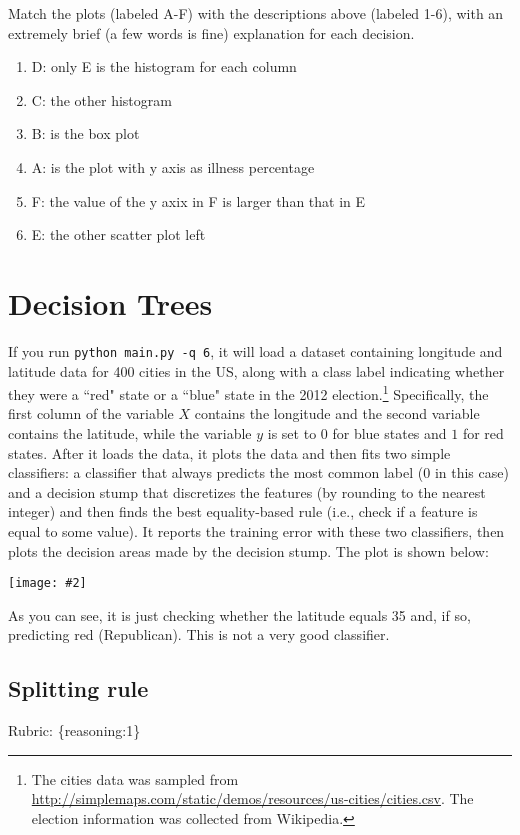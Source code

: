 \documentclass{article}
\def\rubric#1{\gre{Rubric: \{#1\}}}{}
\def\blu#1{{\color{blu}#1}}
\def\gre#1{{\color{gre}#1}}
\def\red#1{{\color{red}#1}}
\newcommand{\centerfig}[2]{\begin{center}\texttt{[image: \#2]}\end{center}}
\begin{document}
\blu{Match the plots (labeled A-F) with the descriptions above (labeled 1-6), with an extremely brief (a few words is fine) explanation for each decision.}

\red{
\begin{enumerate}
    \item D: only E is the histogram for each column
    \item C: the other histogram
    \item B: is the box plot
    \item A: is the plot with y axis as illness percentage
    \item F: the value of the y axix in F is larger than that in E
    \item E: the other scatter plot left
\end{enumerate}
}

\section{Decision Trees}

If you run \texttt{python main.py -q 6}, it will load a dataset containing longitude
and latitude data for 400 cities in the US, along with a class label indicating
 whether they were a ``red" state or a ``blue" state in the 2012
 election.\footnote{The cities data was sampled from \url{http://simplemaps.com/static/demos/resources/us-cities/cities.csv}. The election information was collected from Wikipedia.}
Specifically, the first column of the variable $X$ contains the
longitude and the second variable contains the latitude,
while the variable $y$ is set to $0$ for blue states and $1$ for red states.
After it loads the data, it plots the data and then fits two simple
classifiers: a classifier that always predicts the
most common label ($0$ in this case) and a decision stump
that discretizes the features (by rounding to the nearest integer)
and then finds the best equality-based rule (i.e., check
 if a feature is equal to some value).
It reports the training error with these two classifiers, then plots the decision areas made by the decision stump.
The plot is shown below:

\centerfig{0.7}{../figs/q6_decisionBoundary}

As you can see, it is just checking whether the latitude equals 35 and, if so, predicting red (Republican).
This is not a very good classifier.

\subsection{Splitting rule}
\rubric{reasoning:1}
\end{document}
